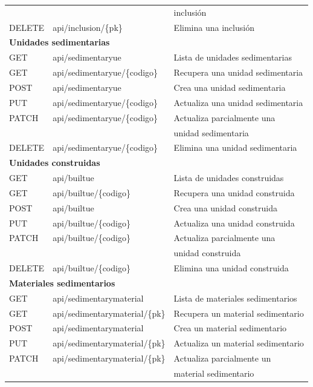 \begin{longtable}[H]{|l|l|l|}
    &  & inclusión \\
    DELETE & api/inclusion/\{pk\} & Elimina una inclusión \\
    \hline\hline
    \multicolumn{3}{|l|}{\textbf{Unidades sedimentarias}} \\
    \hline
    GET & api/sedimentaryue & Lista de unidades sedimentarias \\
    GET & api/sedimentaryue/\{codigo\} & Recupera una unidad sedimentaria \\
    POST & api/sedimentaryue & Crea una unidad sedimentaria \\
    PUT & api/sedimentaryue/\{codigo\} & Actualiza una unidad sedimentaria \\
    PATCH & api/sedimentaryue/\{codigo\} & Actualiza parcialmente una \\
    &  & unidad sedimentaria \\
    DELETE & api/sedimentaryue/\{codigo\} & Elimina una unidad sedimentaria \\
    \hline\hline
    \multicolumn{3}{|l|}{\textbf{Unidades construidas}} \\
    \hline
    GET & api/builtue & Lista de unidades construidas \\
    GET & api/builtue/\{codigo\} & Recupera una unidad construida \\
    POST & api/builtue & Crea una unidad construida \\
    PUT & api/builtue/\{codigo\} & Actualiza una unidad construida \\
    PATCH & api/builtue/\{codigo\} & Actualiza parcialmente una \\
    &  & unidad construida \\
    DELETE & api/builtue/\{codigo\} & Elimina una unidad construida \\
    \hline\hline
    \multicolumn{3}{|l|}{\textbf{Materiales sedimentarios}} \\
    \hline
    GET & api/sedimentarymaterial & Lista de materiales sedimentarios \\
    GET & api/sedimentarymaterial/\{pk\} & Recupera un material sedimentario \\
    POST & api/sedimentarymaterial & Crea un material sedimentario \\
    PUT & api/sedimentarymaterial/\{pk\} & Actualiza un material sedimentario \\
    PATCH & api/sedimentarymaterial/\{pk\} & Actualiza parcialmente un \\
    &  & material sedimentario \\

\end{longtable}
